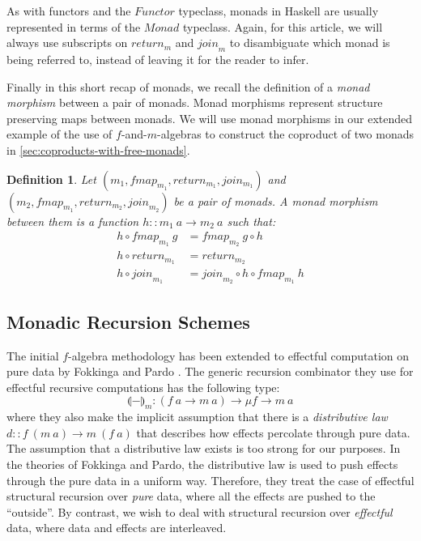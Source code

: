 \documentclass{jfp1}
\newcommand{\fold}[1]{\llparenthesis #1 \rrparenthesis}
\newtheorem{definition}{Definition}
\begin{document}
As with functors and the $\mathit{Functor}$ typeclass, monads in
Haskell are usually represented in terms of the $\textit{Monad}$
typeclass. Again, for this article, we will always use subscripts on
$\mathit{return}_m$ and $\mathit{join}_m$ to disambiguate which monad
is being referred to, instead of leaving it for the reader to infer.

Finally in this short recap of monads, we recall the definition of a
\emph{monad morphism} between a pair of monads. Monad morphisms
represent structure preserving maps between monads. We will use monad
morphisms in our extended example of the use of $f$-and-$m$-algebras
to construct the coproduct of two monads in
\autoref{sec:coproducts-with-free-monads}.

\begin{definition}
  Let $(m_1, \mathit{fmap_{m_1}}, \mathit{return}_{m_1},
  \mathit{join_{m_1}})$ and $(m_2, \mathit{fmap_{m_1}},
  \mathit{return}_{m_2}, \mathit{join}_{m_2})$ be a pair of monads. A
  \emph{monad morphism} between them is a function $h :: m_1~a \to
  m_2~a$ such that:
  \begin{align}
    \label{eq:monad-mor-natural}
    h \circ \mathit{fmap}_{m_1}~g & = \mathit{fmap}_{m_2}~g \circ h \\
    \label{eq:monad-mor-return}
    h \circ \mathit{return}_{m_1} & = \mathit{return}_{m_2} \\
    \label{eq:monad-mor-join}
    h \circ \mathit{join}_{m_1} & = \mathit{join}_{m_2} \circ h \circ \mathit{fmap}_{m_1}~h
  \end{align}
\end{definition}

\subsection{Monadic Recursion Schemes}

The initial $f$-algebra methodology has been extended to effectful
computation on pure data by Fokkinga \cite{fokkinga94monadic} and
Pardo \cite{pardo04combining}. The generic recursion combinator they
use for effectful recursive computations has the following type:
\begin{displaymath}
  \fold{-}_m : (f~a \to m~a) \to \mu f \to m~a
\end{displaymath}
where they also make the implicit assumption that there is a
\emph{distributive law} $d :: f~(m~a) \to m~(f~a)$ that describes how
effects percolate through pure data. The assumption that a
distributive law exists is too strong for our purposes. In the
theories of Fokkinga and Pardo, the distributive law is used to push
effects through the pure data in a uniform way. Therefore, they treat
the case of effectful structural recursion over \emph{pure} data,
where all the effects are pushed to the ``outside''. By contrast, we
wish to deal with structural recursion over \emph{effectful} data,
where data and effects are interleaved.
\end{document}
